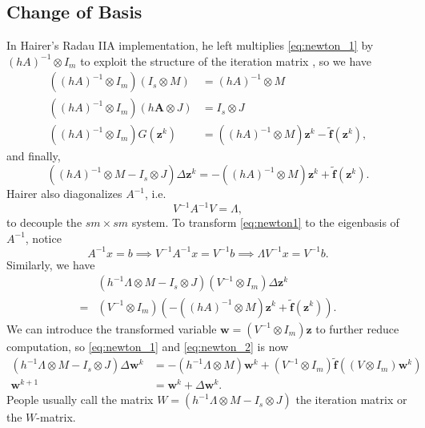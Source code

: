 \documentclass[a4paper,9pt]{article}
\theoremstyle{definition}
\theoremstyle{remark}
\begin{document}
\subsection{Change of Basis}
In Hairer's Radau IIA implementation, he left
multiplies \cref{eq:newton_1} by $(hA)^{-1} \otimes I_m$ to exploit the
structure of the iteration matrix \cite{hairer1999stiff}, so we have
\begin{align}
  ((hA)^{-1} \otimes I_m)(I_s \otimes M) &= (hA)^{-1} \otimes M \\
  ((hA)^{-1} \otimes I_m)(h\bm{A}\otimes J) &= I_s\otimes J \\
  ((hA)^{-1} \otimes I_m)G(\bm{z}^k) &= ((hA)^{-1} \otimes M) \bm{z}^k -
  \tilde{\bm{f}}(\bm{z}^k),
\end{align}
and finally,
\begin{equation} \label{eq:newton1}
  ((hA)^{-1} \otimes M - I_s\otimes J) \Delta \bm{z}^k = -((hA)^{-1} \otimes M)
  \bm{z}^k + \tilde{\bm{f}}(\bm{z}^k).
\end{equation}
Hairer also diagonalizes $A^{-1}$, i.e.
\begin{equation}
  V^{-1}A^{-1}V = \Lambda,
\end{equation}
to decouple the $sm \times sm$ system. To transform \cref{eq:newton1} to the
eigenbasis of $A^{-1}$, notice
\begin{equation}
  A^{-1}x = b \implies V^{-1}A^{-1}x = V^{-1}b \implies \Lambda V^{-1}x =
  V^{-1}b.
\end{equation}
Similarly, we have
\begin{align}
  &(h^{-1} \Lambda \otimes M - I_s\otimes J) (V^{-1}\otimes I_m)\Delta\bm{z}^k\\
  =& (V^{-1}\otimes I_m)(-((hA)^{-1} \otimes M)
  \bm{z}^k + \tilde{\bm{f}}(\bm{z}^k)).
\end{align}
We can introduce the transformed variable $\bm{w} = (V^{-1}\otimes I_m) \bm{z}$
to further reduce computation, so \cref{eq:newton_1} and \cref{eq:newton_2} is now
\begin{align} \label{eq:newton2}
  (h^{-1} \Lambda \otimes M - I_s\otimes J) \Delta\bm{w}^k
  &= -(h^{-1} \Lambda \otimes M) \bm{w}^k +
  (V^{-1}\otimes I_m)\tilde{\bm{f}}((V\otimes I_m)\bm{w}^k) \\
  \bm{w}^{k+1} &= \bm{w}^{k} + \Delta \bm{w}^k.
\end{align}
People usually call the matrix $W=(h^{-1} \Lambda \otimes M - I_s\otimes J)$ the
iteration matrix or the $W$-matrix.
\end{document}
